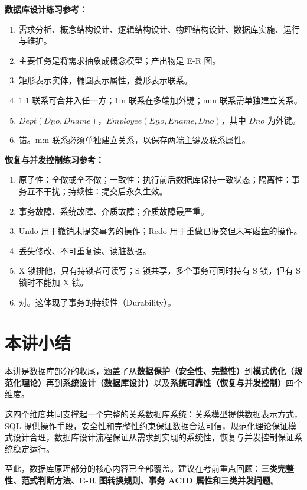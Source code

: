 \documentclass{../../note}
\begin{document}
\textbf{数据库设计练习参考：}

\begin{enumerate}
  \item 需求分析、概念结构设计、逻辑结构设计、物理结构设计、数据库实施、运行与维护。
  \item 主要任务是将需求抽象成概念模型；产出物是 E-R 图。
  \item 矩形表示实体，椭圆表示属性，菱形表示联系。
  \item 1:1 联系可合并入任一方；1:n 联系在多端加外键；m:n 联系需单独建立关系。
  \item $Dept(\underline{Dno}, Dname)$，$Employee(\underline{Eno}, Ename, Dno)$，其中 $Dno$ 为外键。
  \item 错。m:n 联系必须单独建立关系，以保存两端主键及联系属性。
\end{enumerate}

\textbf{恢复与并发控制练习参考：}

\begin{enumerate}
  \item 原子性：全做或全不做；一致性：执行前后数据库保持一致状态；隔离性：事务互不干扰；持续性：提交后永久生效。
  \item 事务故障、系统故障、介质故障；介质故障最严重。
  \item Undo 用于撤销未提交事务的操作；Redo 用于重做已提交但未写磁盘的操作。
  \item 丢失修改、不可重复读、读脏数据。
  \item X 锁排他，只有持锁者可读写；S 锁共享，多个事务可同时持有 S 锁，但有 S 锁时不能加 X 锁。
  \item 对。这体现了事务的持续性（Durability）。
\end{enumerate}

\section{本讲小结}

本讲是数据库部分的收尾，涵盖了从\textbf{数据保护（安全性、完整性）}到\textbf{模式优化（规范化理论）}再到\textbf{系统设计（数据库设计）}以及\textbf{系统可靠性（恢复与并发控制）}四个维度。

这四个维度共同支撑起一个完整的关系数据库系统：关系模型提供数据表示方式，SQL 提供操作手段，安全性和完整性约束保证数据合法可信，规范化理论保证模式设计合理，数据库设计流程保证从需求到实现的系统性，恢复与并发控制保证系统稳定运行。

至此，数据库原理部分的核心内容已全部覆盖。建议在考前重点回顾：\textbf{三类完整性、范式判断方法、E-R 图转换规则、事务 ACID 属性和三类并发问题}。
\end{document}
